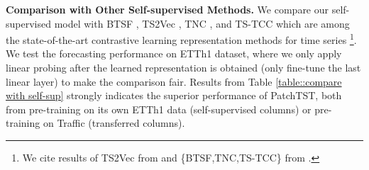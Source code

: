 \documentclass{article} %
\begin{document}
\textbf{Comparison with Other Self-supervised Methods.} We compare our self-supervised model with BTSF \citep{btsf}, TS2Vec \citep{ts2vec}, TNC \citep{tnc}, and TS-TCC \citep{ts-tcc} which are among the state-of-the-art contrastive learning representation methods for time series \footnote{We cite results of TS2Vec from \citep{ts2vec} and \{BTSF,TNC,TS-TCC\} from \citep{btsf}.}. We test the forecasting performance on ETTh1 dataset, where we only apply linear probing after the learned representation is obtained (only fine-tune the last linear layer) to make the comparison fair. Results from Table \ref{table::compare with self-sup} strongly indicates the superior performance of PatchTST, both from pre-training on its own ETTh1 data (self-supervised columns) or pre-training on Traffic (transferred columns).

\end{document}
